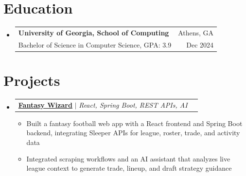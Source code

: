 \documentclass[letterpaper,11pt]{article}
\makeatletter
\newcommand{\resumeItem}[1]{
  \item\small{
    {#1 \vspace{-1pt}}
  }
}
\newcommand{\resumeSubheading}[4]{
  \vspace{-2pt}\item
    \begin{tabular*}{0.97\textwidth}[t]{l@{\extracolsep{\fill}}r}
      \textbf{#1} & #2 \\
      {\small#3} & {\small #4} \\
    \end{tabular*}\vspace{-7pt}
}
\newcommand{\resumeProjectHeading}[2]{
    \item
    \begin{tabular*}{0.97\textwidth}{l@{\extracolsep{\fill}}r}
      \small#1 & #2 \\
    \end{tabular*}\vspace{-7pt}
}
\newcommand{\resumeSubHeadingListStart}{\begin{itemize}[leftmargin=0.15in, label={}]}
\newcommand{\resumeSubHeadingListEnd}{\end{itemize}}
\newcommand{\resumeItemListStart}{\begin{itemize}[leftmargin=0.18in,itemsep=1pt,topsep=2pt]}
\newcommand{\resumeItemListEnd}{\end{itemize}\vspace{-5pt}}
\makeatother
\begin{document}
\section{Education}
  \resumeSubHeadingListStart
    \resumeSubheading
      {University of Georgia, School of Computing}{Athens, GA}
      {Bachelor of Science in Computer Science, GPA: 3.9}{Dec 2024}
  \resumeSubHeadingListEnd

%
\section{Projects}
    \resumeSubHeadingListStart
      \resumeProjectHeading
          {\textbf{\href{https://fantasysportwizard.com}{Fantasy Wizard}} $|$ \emph{React, Spring Boot, REST APIs, AI}}{}
          \resumeItemListStart
            \resumeItem{Built a fantasy football web app with a React frontend and Spring Boot backend, integrating Sleeper APIs for league, roster, trade, and activity data}
            \resumeItem{Integrated scraping workflows and an AI assistant that analyzes live league context to generate trade, lineup, and draft strategy guidance}
          \resumeItemListEnd
    \resumeSubHeadingListEnd

\end{document}
